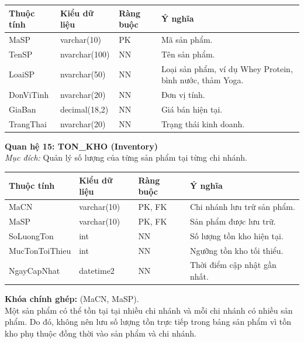 \documentclass[11pt, a4paper]{article}
\begin{document}
\begin{small}
\begin{tabularx}{\textwidth}{| C{2.8cm} | C{2.4cm} | C{2cm} | Y |}
\hline
\textbf{Thuộc tính} & \textbf{Kiểu dữ liệu} & \textbf{Ràng buộc} & \textbf{Ý nghĩa} \\
\hline
MaSP & varchar(10) & PK & Mã sản phẩm. \\
\hline
TenSP & nvarchar(100) & NN & Tên sản phẩm. \\
\hline
LoaiSP & nvarchar(50) & NN & Loại sản phẩm, ví dụ Whey Protein, bình nước, thảm Yoga. \\
\hline
DonViTinh & nvarchar(20) & NN & Đơn vị tính. \\
\hline
GiaBan & decimal(18,2) & NN & Giá bán hiện tại. \\
\hline
TrangThai & nvarchar(20) & NN & Trạng thái kinh doanh. \\
\hline
\end{tabularx}
\end{small}

\vspace{0.8em}
\textbf{Quan hệ 15: TON\_KHO (Inventory)} \\
\textit{Mục đích:} Quản lý số lượng của từng sản phẩm tại từng chi nhánh.

\begin{small}
\begin{tabularx}{\textwidth}{| C{3cm} | C{2.4cm} | C{2.2cm} | Y |}
\hline
\textbf{Thuộc tính} & \textbf{Kiểu dữ liệu} & \textbf{Ràng buộc} & \textbf{Ý nghĩa} \\
\hline
MaCN & varchar(10) & PK, FK & Chi nhánh lưu trữ sản phẩm. \\
\hline
MaSP & varchar(10) & PK, FK & Sản phẩm được lưu trữ. \\
\hline
SoLuongTon & int & NN & Số lượng tồn kho hiện tại. \\
\hline
MucTonToiThieu & int & NN & Ngưỡng tồn kho tối thiểu. \\
\hline
NgayCapNhat & datetime2 & NN & Thời điểm cập nhật gần nhất. \\
\hline
\end{tabularx}
\end{small}

\textbf{Khóa chính ghép:} (MaCN, MaSP). \\
Một sản phẩm có thể tồn tại tại nhiều chi nhánh và mỗi chi nhánh có nhiều sản phẩm. Do đó, không nên lưu số lượng tồn trực tiếp trong bảng sản phẩm vì tồn kho phụ thuộc đồng thời vào sản phẩm và chi nhánh.
\end{document}
